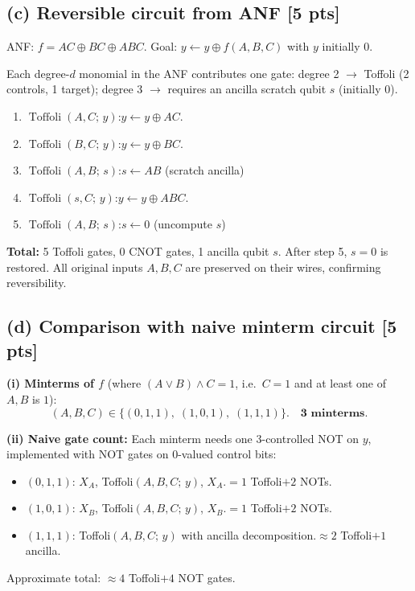 \documentclass[11pt,a4paper]{article}
\begin{document}
\subsection*{(c) Reversible circuit from ANF [5 pts]}

ANF: $f=AC\oplus BC\oplus ABC$. Goal: $y\leftarrow y\oplus f(A,B,C)$ with $y$ initially $0$.

Each degree-$d$ monomial in the ANF contributes one gate:
degree 2 $\to$ Toffoli (2 controls, 1 target);
degree 3 $\to$ requires an ancilla scratch qubit $s$ (initially $0$).

\medskip
\begin{enumerate}[label=\arabic*.]
  \item $\operatorname{Toffoli}(A,C;\,y)$:\quad $y\leftarrow y\oplus AC$.
  \item $\operatorname{Toffoli}(B,C;\,y)$:\quad $y\leftarrow y\oplus BC$.
  \item $\operatorname{Toffoli}(A,B;\,s)$:\quad $s\leftarrow AB$ \hfill (scratch ancilla)
  \item $\operatorname{Toffoli}(s,C;\,y)$:\quad $y\leftarrow y\oplus ABC$.
  \item $\operatorname{Toffoli}(A,B;\,s)$:\quad $s\leftarrow0$ \hfill (uncompute $s$)
\end{enumerate}

\textbf{Total:} 5 Toffoli gates, 0 CNOT gates, 1 ancilla qubit $s$.
After step 5, $s=0$ is restored. All original inputs $A,B,C$ are preserved on their wires,
confirming reversibility.

\subsection*{(d) Comparison with naive minterm circuit [5 pts]}

\textbf{(i) Minterms of $f$} (where $(A\lor B)\land C=1$, i.e.\ $C=1$ and at least one of $A,B$ is $1$):
\[
(A,B,C)\in\{(0,1,1),\;(1,0,1),\;(1,1,1)\}.\quad\textbf{3 minterms.}
\]

\textbf{(ii) Naive gate count:} Each minterm needs one 3-controlled NOT on $y$,
implemented with NOT gates on $0$-valued control bits:
\begin{itemize}
  \item $(0,1,1)$: $X_A$, Toffoli$(A,B,C;\,y)$, $X_A$.\quad$=1$ Toffoli$+2$ NOTs.
  \item $(1,0,1)$: $X_B$, Toffoli$(A,B,C;\,y)$, $X_B$.\quad$=1$ Toffoli$+2$ NOTs.
  \item $(1,1,1)$: Toffoli$(A,B,C;\,y)$ with ancilla decomposition.\quad$\approx 2$ Toffoli$+1$ ancilla.
\end{itemize}
Approximate total: $\approx4$ Toffoli$+4$ NOT gates.
\end{document}
